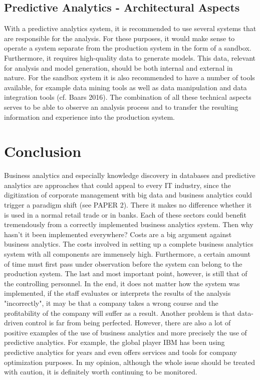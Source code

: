 \documentclass[12pt,twocolumn,twoside]{conference}   %
\begin{document}
\subsection{Predictive Analytics - Architectural Aspects}
With a predictive analytics system, it is recommended to use several systems that are responsible for the analysis. For these purposes, it would make sense to operate a system separate from the production system in the form of a sandbox. Furthermore, it requires high-quality data to generate models. This data, relevant for analysis and model generation, should be both internal and external in nature. For the sandbox system it is also recommended to have a number of tools available, for example data mining tools as well as data manipulation and data integration tools (cf. Baars 2016). The combination of all these technical aspects serves to be able to observe an analysis process and to transfer the resulting information and experience into the production system. 

\section{Conclusion}
Business analytics and especially knowledge discovery in databases and predictive analytics are approaches that could appeal to every IT industry, since the digitization of corporate management with big data and business analytics could trigger a paradigm shift (see PAPER 2). There it makes no difference whether it is used in a normal retail trade or in banks. Each of these sectors could benefit tremendously from a correctly implemented business analytics system. Then why hasn't it been implemented everywhere? Costs are a big argument against business analytics. The costs involved in setting up a complete business analytics system with all components are immensely high. Furthermore, a certain amount of time must first pass under observation before the system can belong to the production system. The last and most important point, however, is still that of the controlling personnel. In the end, it does not matter how the system was implemented, if the staff evaluates or interprets the results of the analysis "incorrectly", it may be that a company takes a wrong course and the profitability of the company will suffer as a result. Another problem is that data-driven control is far from being perfected. However, there are also a lot of positive examples of the use of business analytics and more precisely the use of predictive analytics. For example, the global player IBM has been using predictive analytics for years and even offers services and tools for company optimization purposes. In my opinion, although the whole issue should be treated with caution, it is definitely worth continuing to be monitored.  
\newpage
\end{document}
